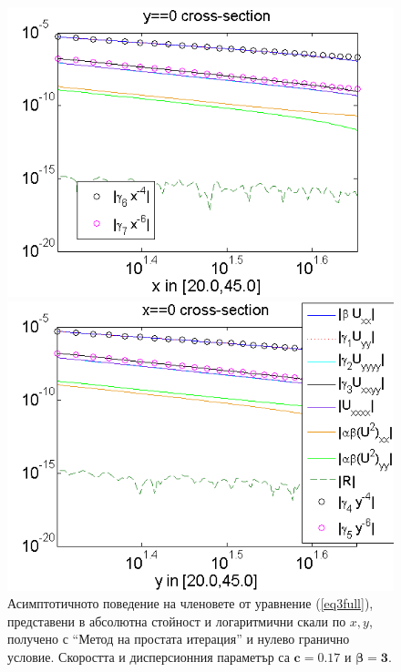 \documentclass{article}
\newcommand{\rf}[1]{(\ref{#1})}
\theoremstyle{remark}
\begin{document}
\FloatBarrier
\begin{figure}[ht]
	\begin{minipage}[b]{0.95\linewidth}
		\raggedleft
		\includegraphics[width=\linewidth]{AssymptForEachTerm/c017_bt1_5/ChristovIC_AlongX_50_ZB2_bt3_c017_h020_O(h^6).png}
	\end{minipage}
	\begin{minipage}[b]{0.95\linewidth}
		 \raggedright
		\includegraphics[width=\linewidth]{AssymptForEachTerm/c017_bt1_5/ChristovIC_AlongY_50_ZB2_bt3_c017_h020_O(h^6).png}
	\end{minipage}
	\caption{Асимптотичното поведение на членовете от уравнение \rf{eq3full}, представени в абсолютна стойност и логаритмични скали по $x,y$, получено с ``Метод на простата итерация'' и нулево гранично условие. Скоростта и дисперсионния параметър са $\boldsymbol{c=0.17}$ и $\boldsymbol{\beta = 3}$.}
	\label{fig:assympt_c017bt3}
\end{figure}
\end{document}
